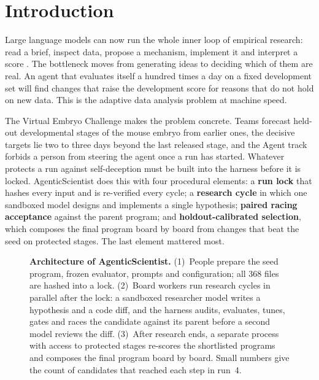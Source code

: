 \documentclass[9pt,twocolumn,a4paper]{extarticle}
\begin{document}
\section{Introduction}

Large language models can now run the whole inner loop of empirical research: read a brief, inspect data, propose a mechanism, implement it and interpret a score \cite{lu2024aiscientist,romera2024funsearch,novikov2025alphaevolve}. The bottleneck moves from generating ideas to deciding which of them are real. An agent that evaluates itself a hundred times a day on a fixed development set will find changes that raise the development score for reasons that do not hold on new data. This is the adaptive data analysis problem \cite{dwork2015reusable,blum2015ladder} at machine speed.

The Virtual Embryo Challenge \cite{vec2026} makes the problem concrete. Teams forecast held-out developmental stages
of the mouse embryo from earlier ones, the decisive targets lie two to three days beyond the last released stage, and
the Agent track forbids a person from steering the agent once a run has started. Whatever protects a run against
self-deception must be built into the harness before it is locked. AgenticScientist does this with four procedural
elements: a \textbf{run lock} that hashes every input and is re-verified every cycle; a \textbf{research cycle} in
which one sandboxed model designs and implements a single hypothesis; \textbf{paired racing acceptance} against the
parent program; and \textbf{holdout-calibrated selection}, which composes the final program board by board from
changes that beat the seed on protected stages. The last element mattered most.

\begin{figure}[t]
\centering
\resizebox{\textwidth}{!}{}
\caption{\textbf{Architecture of AgenticScientist.} (1)~People prepare the seed program, frozen evaluator, prompts
and configuration; all 368 files are hashed into a lock. (2)~Board workers run research cycles in parallel after the lock: a sandboxed researcher model writes a hypothesis and a code diff, and the harness audits, evaluates,
tunes, gates and races the candidate against its parent before a second model reviews the diff. (3)~After research ends, a separate process with access
to protected stages re-scores the shortlisted programs and composes the final program board by board. Small numbers
give the count of candidates that reached each step in run~4.}
\label{fig:arch}
\end{figure}
\end{document}
